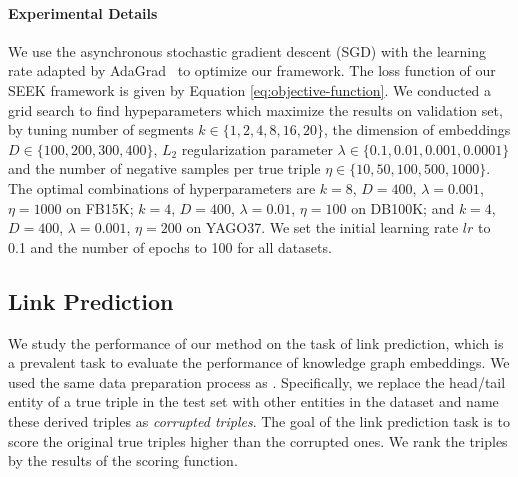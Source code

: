\documentclass[11pt,a4paper]{article}
\begin{document}
\paragraph*{Experimental Details}

We use the asynchronous stochastic gradient descent (SGD) with the learning rate adapted by AdaGrad~\cite{duchi2011adaptive} to optimize our framework. The loss function of our SEEK framework is given by Equation \ref{eq:objective-function}. We conducted a grid search to find hypeparameters which maximize the results on validation set, by tuning number of segments $k\in\{1, 2, 4, 8, 16, 20\}$, the dimension of embeddings $D\in\{100, 200, 300, 400\}$, $L_2$ regularization parameter $\lambda\in\{0.1, 0.01, 0.001, 0.0001\}$ and the number of negative samples per true triple $\eta\in\{10, 50, 100, 500, 1000\}$. The optimal combinations of hyperparameters are $k = 8$, $D = 400$, $\lambda = 0.001$, $\eta = 1000$ on FB15K; $k = 4$, $D = 400$, $\lambda = 0.01$, $\eta = 100$ on DB100K; and $k = 4$, $D = 400$, $\lambda = 0.001$, $\eta = 200$ on YAGO37. We set the initial learning rate $lr$ to 0.1 and the number of epochs to 100 for all datasets. 

\subsection{Link Prediction}

We study the performance of our method on the task of link prediction, which is a prevalent task to evaluate the performance of knowledge graph embeddings. We used the same data preparation process as \cite{bordes2013translating}. Specifically, we replace the head/tail entity of a true triple in the test set with other entities in the dataset and name these derived triples as \textit{corrupted triples}. The goal of the link prediction task is to score the original true triples higher than the corrupted ones. We rank the triples by the results of the scoring function.
\end{document}
